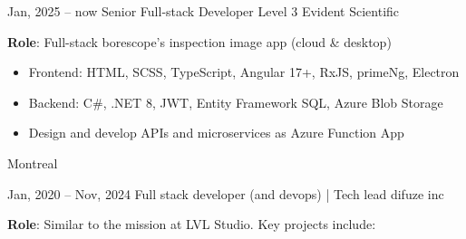 \documentclass[
  a4paper,
   maincolor=cvblue,
   sectioncolor=cvblue,
   sidebarwidth=0.323\paperwidth,
]{fortysecondscv}
\begin{document}
\newpage
\restoregeometry
{}\paperwidth

\makefrontsidebar

\vspace*{-3.7em} %



\begin{cvtableNew}


  \cvitemRightNew
    {Jan, 2025 – now} %
    {Senior Full-stack Developer Level 3} %
    {Evident Scientific} %
    {
      \vspace{0.1pt} %
      \fontsize{10.8pt}{12pt}\selectfont %
      \textbf{Role}: Full-stack borescope's inspection image app (cloud \& desktop)\vspace{4pt}
      \begin{itemize}[itemsep=-1mm, topsep=0pt, leftmargin=8pt]
        \item Frontend: HTML, SCSS, TypeScript, Angular 17+, RxJS, primeNg, Electron\vspace{5pt}
        \item Backend: C\#, .NET 8, JWT, Entity Framework SQL, Azure Blob Storage\vspace{5pt}
        \item Design and develop APIs and microservices as Azure Function App\vspace{5pt}
      \end{itemize}
    }
    {Montreal} %

    \vspace{1.6mm} %


  \cvitemRightNew
      {Jan, 2020 – Nov, 2024} %
      {Full stack developer (and devops) | Tech lead} %
      {difuze inc} %
      {
        \vspace{0.1pt} %
        \fontsize{10.8pt}{12pt}\selectfont %
        \textbf{Role}: Similar to the mission at LVL Studio. Key projects include:\vspace{5pt}

}
\end{cvtableNew}
\end{document}
